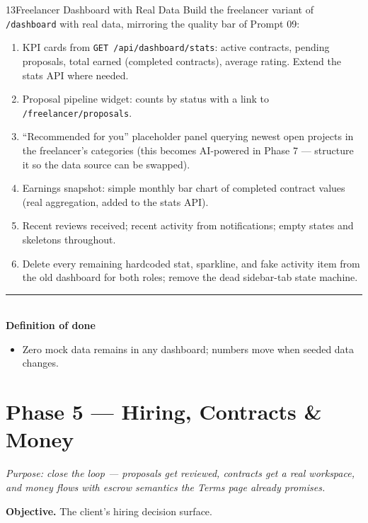 \documentclass[11pt,a4paper]{article}
\newcommand{\dod}{\medskip\noindent\textcolor{donegreen}{\rule{\linewidth}{0.5pt}}\\[1mm]\textbf{\textcolor{donegreen}{Definition of done}}\\[-2mm]}
\newcommand{\objective}[1]{\noindent\textbf{Objective.} #1\medskip}
\begin{document}
\begin{promptbox}{13}{Freelancer Dashboard with Real Data}
Build the freelancer variant of \texttt{/dashboard} with real data, mirroring the
quality bar of Prompt 09:

\begin{enumerate}[leftmargin=1.6em]
  \item KPI cards from \texttt{GET /api/dashboard/stats}: active contracts, pending
        proposals, total earned (completed contracts), average rating. Extend the
        stats API where needed.
  \item Proposal pipeline widget: counts by status with a link to
        \texttt{/freelancer/proposals}.
  \item ``Recommended for you'' placeholder panel querying newest open projects in
        the freelancer's categories (this becomes AI-powered in Phase 7 --- structure
        it so the data source can be swapped).
  \item Earnings snapshot: simple monthly bar chart of completed contract values
        (real aggregation, added to the stats API).
  \item Recent reviews received; recent activity from notifications; empty states
        and skeletons throughout.
  \item Delete every remaining hardcoded stat, sparkline, and fake activity item
        from the old dashboard for both roles; remove the dead sidebar-tab state
        machine.
\end{enumerate}

\dod
\begin{itemize}[leftmargin=1.6em]
  \item Zero mock data remains in any dashboard; numbers move when seeded data
        changes.
\end{itemize}
\end{promptbox}

\section{Phase 5 --- Hiring, Contracts \& Money}

\textit{Purpose: close the loop --- proposals get reviewed, contracts get a real
workspace, and money flows with escrow semantics the Terms page already promises.}

\objective{The client's hiring decision surface.}
\end{document}
